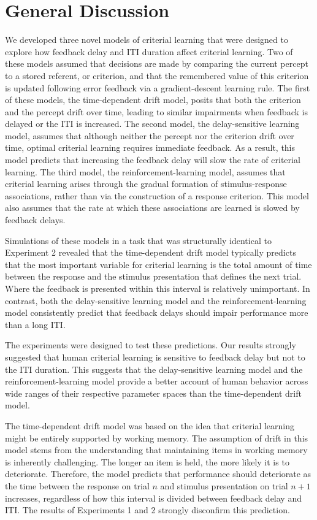 \documentclass[doc, floatsintext]{apa7}
\begin{document}
\section{General Discussion}
We developed three novel models of criterial learning that
were designed to explore how feedback delay and ITI duration
affect criterial learning. Two of these models assumed that
decisions are made by comparing the current percept to a
stored referent, or criterion, and that the remembered value
of this criterion is updated following error feedback via a
gradient-descent learning rule. The first of these models,
the time-dependent drift model, posits that both the
criterion and the percept drift over time, leading to
similar impairments when feedback is delayed or the ITI is
increased. The second model, the delay-sensitive learning
model, assumes that although neither the percept nor the
criterion drift over time, optimal criterial learning
requires immediate feedback. As a result, this model
predicts that increasing the feedback delay will slow the
rate of criterial learning. The third model, the
reinforcement-learning model, assumes that criterial
learning arises through the gradual formation of
stimulus-response associations, rather than via the
construction of a response criterion. This model also
assumes that the rate at which these associations are
learned is slowed by feedback delays.

Simulations of these models in a task that was structurally
identical to Experiment 2 revealed that the time-dependent
drift model typically predicts that the most important
variable for criterial learning is the total amount of time
between the response and the stimulus presentation that
defines the next trial. Where the feedback is presented
within this interval is relatively unimportant. In contrast,
both the delay-sensitive learning model and the
reinforcement-learning model consistently predict that
feedback delays should impair performance more than a long
ITI. 

The experiments were designed to test these predictions. Our
results strongly suggested that human criterial learning is
sensitive to feedback delay but not to the ITI duration.
This suggests that the delay-sensitive learning model and
the reinforcement-learning model provide a better account of
human behavior across wide ranges of their respective
parameter spaces than the time-dependent drift model.

The time-dependent drift model was based on the idea that
criterial learning might be entirely supported by working
memory. The assumption of drift in this model stems from the
understanding that maintaining items in working memory is
inherently challenging.  The longer an item is held, the
more likely it is to deteriorate. Therefore, the model
predicts that performance should deteriorate as the time
between the response on trial $n$ and stimulus presentation
on trial $n+1$ increases, regardless of how this interval is
divided between feedback delay and ITI. The results of
Experiments 1 and 2 strongly disconfirm this prediction. 
\end{document}
